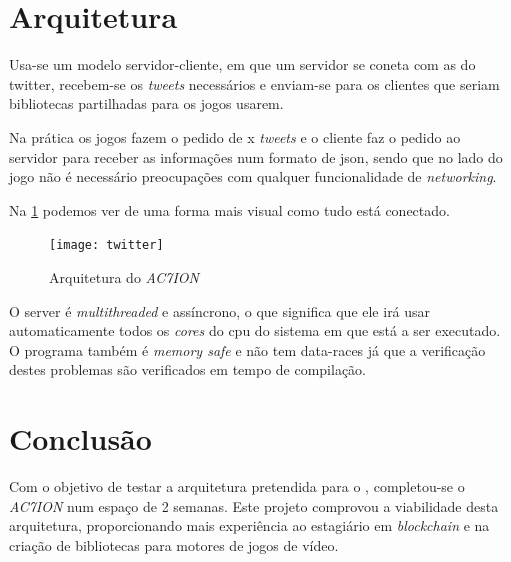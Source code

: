 \section{Arquitetura}

Usa-se um modelo servidor-cliente, em que um servidor se coneta com as  do \gls{twitter}, recebem-se os \textit{tweets} necessários e enviam-se para os clientes que seriam bibliotecas partilhadas para os jogos usarem.

Na prática os jogos fazem o pedido de x \textit{tweets} e o cliente faz o pedido ao servidor para receber as
informações num formato de \acrshort{json}, sendo que no lado do jogo não é necessário preocupações com qualquer funcionalidade de \textit{networking}.

Na \cref{fig:twitter_arq} podemos ver de uma forma mais visual como tudo está conectado.

\begin{figure}[!ht]
  \centering
  \texttt{[image: twitter]}
  \caption{Arquitetura do \textit{AC7ION}}
  \label{fig:twitter_arq}
\end{figure}


O server é \textit{multithreaded} e assíncrono, o que significa que ele irá usar automaticamente todos os \textit{cores} do \acrshort{cpu} do sistema em que está a ser executado. O programa também é \textit{memory safe} e não tem \glspl{data-race} já que a verificação destes problemas são verificados em tempo de compilação. \cite{rust-fearless}

\newpage
\section{Conclusão}

Com o objetivo de testar a arquitetura pretendida para o \gamechaining{}, completou-se o \textit{AC7ION} num espaço de 2 semanas. Este projeto comprovou a viabilidade desta arquitetura, proporcionando mais experiência ao estagiário em \textit{blockchain} e na criação de bibliotecas para motores de jogos de vídeo.


